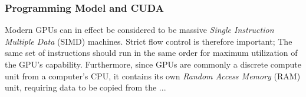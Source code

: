 \subsubsection{Programming Model and CUDA}

Modern GPUs can in effect be considered to be massive \textit{Single Instruction Multiple Data} (SIMD) machines. Strict flow control is therefore important; The same set of instructions should run in the same order for maximum utilization of the GPU's capability.
Furthermore, since GPUs are commonly a discrete compute unit from a computer's CPU, it contains its own \textit{Random Access Memory} (RAM) unit, requiring data to be copied from the ...

